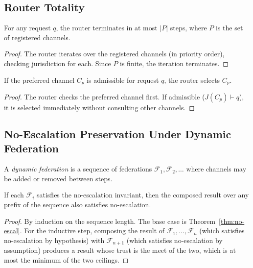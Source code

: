 \documentclass[11pt]{article}
\begin{document}
\subsection{Router Totality}
\label{app:router}

\begin{lemma}
\label{lem:router-term}
For any request $q$, the router terminates in at most $|P|$
steps, where $P$ is the set of registered channels.
\end{lemma}

\begin{proof}
The router iterates over the registered channels (in priority
order), checking jurisdiction for each.  Since $P$ is finite,
the iteration terminates.
\end{proof}

\begin{lemma}
\label{lem:router-pref}
If the preferred channel $C_p$ is admissible for request $q$,
the router selects $C_p$.
\end{lemma}

\begin{proof}
The router checks the preferred channel first.  If admissible
($J(C_p) \vdash q$), it is selected immediately without
consulting other channels.
\end{proof}

\subsection{No-Escalation Preservation Under Dynamic Federation}
\label{app:dynamic}

\begin{definition}
\label{def:dynamic-fed}
A \emph{dynamic federation} is a sequence of federations
$\mathcal{F}_1, \mathcal{F}_2, \ldots$ where channels may be
added or removed between steps.
\end{definition}

\begin{theorem}
\label{thm:dynamic-noescal}
If each $\mathcal{F}_i$ satisfies the no-escalation invariant,
then the composed result over any prefix of the sequence also
satisfies no-escalation.
\end{theorem}

\begin{proof}
By induction on the sequence length.  The base case is
Theorem~\ref{thm:no-escal}.  For the inductive step, composing
the result of $\mathcal{F}_1, \ldots, \mathcal{F}_n$ (which
satisfies no-escalation by hypothesis) with $\mathcal{F}_{n+1}$
(which satisfies no-escalation by assumption) produces a result
whose trust is the meet of the two, which is at most the
minimum of the two ceilings.
\end{proof}
\end{document}
